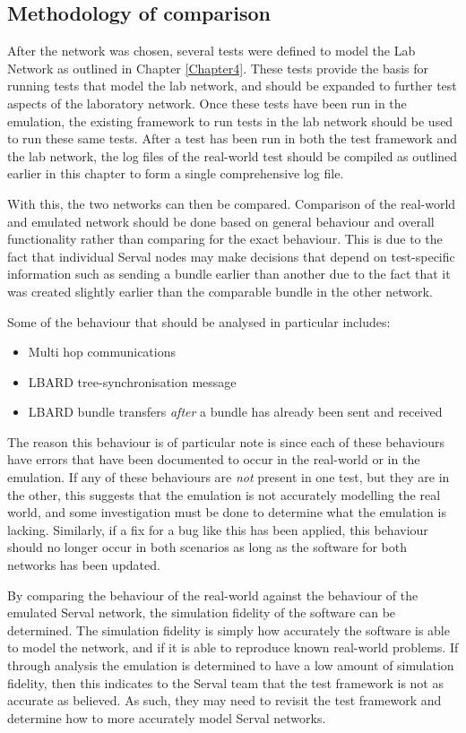 \subsection{Methodology of comparison}
After the network was chosen, several tests were defined to model the Lab Network as outlined in Chapter \ref{Chapter4}.
These tests provide the basis for running tests that model the lab network, and should be expanded to further test aspects of the laboratory network.
Once these tests have been run in the emulation, the existing framework to run tests in the lab network should be used to run these same tests.
After a test has been run in both the test framework and the lab network, the log files of the real-world test should be compiled as outlined earlier in this chapter to form a single comprehensive log file.

With this, the two networks can then be compared.
Comparison of the real-world and emulated network should be done based on general behaviour and overall functionality rather than comparing for the exact behaviour.
This is due to the fact that individual Serval nodes may make decisions that depend on test-specific information such as sending a bundle earlier than another due to the fact that it was created slightly earlier than the comparable bundle in the other network.

Some of the behaviour that should be analysed in particular includes:
\begin{itemize}
    \item Multi hop communications
    \item LBARD tree-synchronisation message
    \item LBARD bundle transfers \emph{after} a bundle has already been sent and received
\end{itemize}

The reason this behaviour is of particular note is since each of these behaviours have errors that have been documented to occur in the real-world or in the emulation.
If any of these behaviours are \emph{not} present in one test, but they are in the other, this suggests that the emulation is not accurately modelling the real world, and some investigation must be done to determine what the emulation is lacking.
Similarly, if a fix for a bug like this has been applied, this behaviour should no longer occur in both scenarios as long as the software for both networks has been updated.


By comparing the behaviour of the real-world against the behaviour of the emulated Serval network, the simulation fidelity of the software can be determined.
The simulation fidelity is simply how accurately the software is able to model the network, and if it is able to reproduce known real-world problems.
If through analysis the emulation is determined to have a low amount of simulation fidelity, then this indicates to the Serval team that the test framework is not as accurate as believed.
As such, they may need to revisit the test framework and determine how to more accurately model Serval networks.

